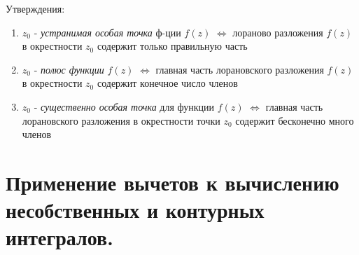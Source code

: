 \documentclass[12pt]{extarticle}
\begin{document}
\par Утверждения:
\begin{enumerate}
    \itemsep0em
    \item $z_{0}$ - \textit{устранимая особая точка} ф-ции $f(z)$
        $\Leftrightarrow $ лораново разложения $f(z)$ в окрестности
        $z_{0}$ содержит только правильную часть
    \item $z_{0}$ - \textit{полюс функции} $f(z)$ $\Leftrightarrow $ главная
        часть лорановского разложения $f(z)$ в окрестности $z_{0}$
        содержит конечное число членов
    \item $z_{0}$ - \textit{существенно особая точка} для функции $f(z)$
        $\Leftrightarrow $ главная часть лорановского разложения в
        окрестности точки $z_{0}$ содержит бесконечно много членов
\end{enumerate}


\section{Применение вычетов к вычислению несобственных и контурных
интегралов.}
\end{document}
